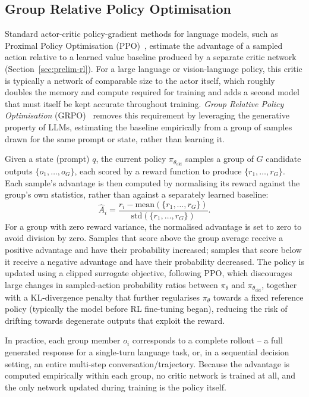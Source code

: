 \subsection{Group Relative Policy Optimisation}
\label{sec:prelim-grpo}

Standard actor-critic policy-gradient methods for language models, such as Proximal Policy Optimisation (PPO)~\cite{schulman2017proximal}, estimate the advantage of a sampled action relative to a learned value baseline produced by a separate critic network (Section~\ref{sec:prelim-rl}). For a large language or vision-language policy, this critic is typically a network of comparable size to the actor itself, which roughly doubles the memory and compute required for training and adds a second model that must itself be kept accurate throughout training. \emph{Group Relative Policy Optimisation} (GRPO)~\cite{shao2024deepseekmath} removes this requirement by leveraging the generative property of LLMs, estimating the baseline empirically from a group of samples drawn for the same prompt or state, rather than learning it.

Given a state (prompt) $q$, the current policy $\pi_{\theta_{\mathrm{old}}}$ samples a group of $G$ candidate outputs $\{o_1, \ldots, o_G\}$, each scored by a reward function to produce $\{r_1, \ldots, r_G\}$. Each sample's advantage is then computed by normalising its reward against the group's own statistics, rather than against a separately learned baseline:
\begin{equation}
    \hat{A}_i = \frac{r_i - \mathrm{mean}(\{r_1, \ldots, r_G\})}{\mathrm{std}(\{r_1, \ldots, r_G\})}.
    \label{eq:grpo-advantage}
\end{equation}
For a group with zero reward variance, the normalised advantage is set to zero to avoid division by zero. Samples that score above the group average receive a positive advantage and have their probability increased; samples that score below it receive a negative advantage and have their probability decreased. The policy is updated using a clipped surrogate objective, following PPO, which discourages large changes in sampled-action probability ratios between $\pi_\theta$ and $\pi_{\theta_{\mathrm{old}}}$, together with a KL-divergence penalty that further regularises $\pi_\theta$ towards a fixed reference policy (typically the model before RL fine-tuning began), reducing the risk of drifting towards degenerate outputs that exploit the reward.

In practice, each group member $o_i$ corresponds to a complete rollout -- a full generated response for a single-turn language task, or, in a sequential decision setting, an entire multi-step conversation/trajectory. Because the advantage is computed empirically within each group, no critic network is trained at all, and the only network updated during training is the policy itself.

